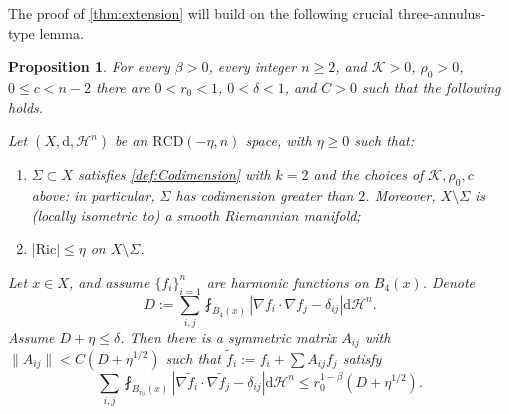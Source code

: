 \documentclass[12pt,a4paper,reqno]{amsart}
\newtheorem{prop}[theorem]{Proposition}
\renewcommand{\leq}{\leqslant}
\renewcommand{\geq}{\geqslant}
\renewcommand{\d}{\ensuremath{\mathrm d}}
\renewcommand{\tilde}{\widetilde}
\begin{document}
The proof of \cref{thm:extension} will build on the following crucial three-annulus-type lemma.
\begin{prop}\label{propThreeAnnulus}
    For every $\beta>0$, every integer $n\geq 2$, and $\mathcal{K}>0$, $\rho_0>0$, $0\leq c<n-2$ there are $0<r_0<1$, $0<\delta<1$, and $C>0$ such that the following holds. 
    
    Let $(X,\mathrm{d},\mathcal{H}^n)$ be an $\mathrm{RCD}(-\eta,n)$ space, with $\eta\geq 0$ such that:
    \begin{enumerate}
        \item $\Sigma \subset X$ satisfies \cref{def:Codimension} with $k=2$ and the choices of $\mathcal{K},\rho_0,c$ above: in particular, $\Sigma$ has codimension greater than $2$. Moreover, $X\setminus\Sigma$ is (locally isometric to) a smooth Riemannian manifold;
        \item $|\mathrm{Ric}| \leq \eta$ on $X\setminus \Sigma$.
    \end{enumerate}
    Let $x\in X$, and assume $\{f_i\}_{i=1}^n$ are harmonic functions on $B_4(x)$. Denote
    \[ 
    D:=\sum_{i,j} \fint_{B_4(x)} |\nabla f_i \cdot \nabla f_j - \delta_{ij}|\mathrm{d}\mathcal{H}^n.
    \]
    Assume $D+\eta\leq \delta$. Then there is a symmetric matrix $A_{ij}$ with $\|A_{ij}\| < C(D+\eta^{1/2})$ such that $\tilde{f}_i := f_i + \sum A_{ij}f_j$ satisfy
    \[ \sum_{i,j} \fint_{B_{r_0}(x)} |\nabla \tilde{f}_i\cdot \nabla \tilde{f}_j - \delta_{ij}|\d\mathcal{H}^n \leq r_0^{1-\beta} (D+\eta^{1/2}). \]
\end{prop}
\end{document}
